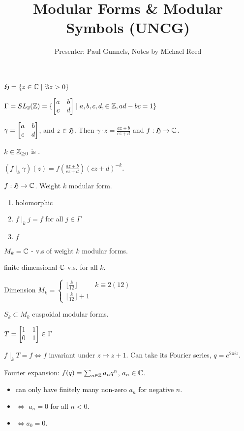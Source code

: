 \documentclass[]{article}
\title{Modular Forms \& Modular Symbols (UNCG)}
\author{Presenter: Paul Gunnels, Notes by Michael Reed}
\begin{document}
\maketitle

$\frak{H} = \{ z \in \mathbb{C} \mid \Im z > 0 \}$

$\Gamma = SL_2(\mathbb{Z}) = \{ \begin{bmatrix}a & b \\ c & d\end{bmatrix} \mid a,b,c,d,\in \mathbb{Z}, ad-bc = 1 \}$

$\gamma = \begin{bmatrix}a & b \\ c & d\end{bmatrix}$, and $z\in\frak{H}$. Then $\gamma\cdot z = \frac{az+b}{cz+d}$ and $f: \frak{H} \rightarrow \mathbb{C}$.

$k\in \mathbb{Z}_{\geq 0}$ is . 

$(f\mid_k \gamma)(z) = f(\frac{az+b}{cz+d})(cz+d)^{-k}$.

\begin{definition}
	$f: \frak{H} \rightarrow \mathbb{C}$. Weight $k$ modular form.
	\begin{enumerate}
		\item holomorphic
		\item $f\mid_k j = f$ for all $j\in \Gamma$
		\item $f$ 
	\end{enumerate}
\end{definition}

$M_k = \mathbb{C}$ - v.s of weight $k$ modular forms.

\begin{fact}
	finite dimensional $\mathbb{C}$-v.s. for all $k$.
\end{fact}

Dimension $M_k = \begin{cases} \lfloor \frac{k}{12} \rfloor & k \equiv 2 (12) \\ \lfloor \frac{k}{12} \rfloor + 1 \end{cases}$

$S_k \subset M_k$ cuspoidal modular forms.

$T = \begin{bmatrix}1 & 1 \\ 0 & 1\end{bmatrix} \in \Gamma$

$f\mid_k T = f \iff f$ invariant under $z\mapsto z + 1$. Can take its Fourier series, $q=e^{2\pi i z}$.

Fourier expansion: $f(q) = \sum_{n\in \mathbb{Z}} a_n q^n$, $a_n \in\mathbb{C}$.
\begin{itemize}
	\item can only have finitely many non-zero $a_n$ for negative $n$.
	\item {} $\iff$ $a_n = 0$ for all $n<0$.
	\item {} $\iff a_0 = 0$.
\end{itemize}
\end{document}
